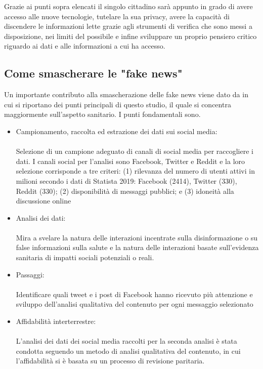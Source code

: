\documentclass{article}
\begin{document}
\begin{itemize}
Grazie ai punti sopra elencati il singolo cittadino sarà appunto in grado di avere accesso alle nuove tecnologie, tutelare la sua privacy, avere la capacità di discendere le informazioni lette grazie agli strumenti di verifica che sono messi a disposizione, nei limiti del possibile e infine sviluppare un proprio pensiero critico riguardo ai dati e alle informazioni a cui ha accesso.
\end{itemize}
\subsection{Come smascherare le "fake news"}
Un importante contributo alla smascherazione delle fake news viene dato da \cite{pulido2020new} in cui si riportano dei punti principali di questo studio, il quale si concentra maggiormente sull'aspetto sanitario.
I punti fondamentali sono.
\begin{itemize}
    \item Campionamento, raccolta ed estrazione dei dati sui social media: \\
    \\
     Selezione di un campione adeguato di canali di social media per raccogliere i dati. I canali social per l'analisi sono Facebook, Twitter e Reddit e la loro selezione corrisponde a tre criteri: (1) rilevanza del numero di utenti attivi in milioni secondo i dati di Statista 2019: Facebook (2414), Twitter (330), Reddit (330); (2) disponibilità di messaggi pubblici; e (3) idoneità alla discussione online
    \item Analisi dei dati: \\
    \\
    Mira a svelare la natura delle interazioni incentrate sulla disinformazione o su false informazioni sulla salute e la natura delle interazioni basate sull'evidenza sanitaria di impatti sociali potenziali o reali. 
    \item Passaggi: \\
    \\
     Identificare quali tweet e i post di Facebook hanno ricevuto più attenzione e sviluppo dell'analisi qualitativa del contenuto per ogni messaggio selezionato 
    \item Affidabilità interterrestre: \\
    \\
    L'analisi dei dati dei social media raccolti per la seconda analisi è stata condotta seguendo un metodo di analisi qualitativa del contenuto, in cui l'affidabilità si è basata su un processo di revisione paritaria.
\end{itemize}
\end{document}
